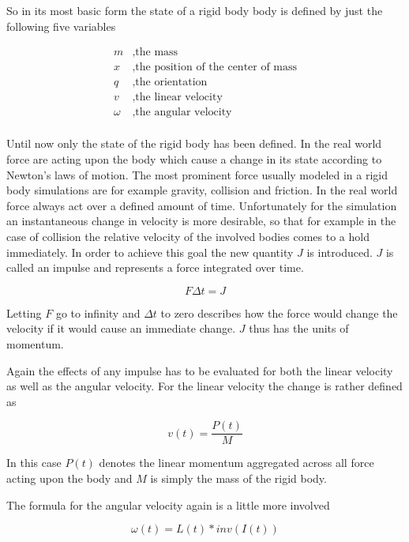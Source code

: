 So in its most basic form the state of a rigid body body is defined by just the following five variables

\begin{align*}
m &, \text{the mass} \\
x &, \text{the position of the center of mass} \\
q &, \text{the orientation} \\
v &, \text{the linear velocity} \\
\omega &, \text{the angular velocity} \\
\end{align*}

Until now only the state of the rigid body has been defined. In the real world force are acting upon the body which cause a change in its state according to Newton's laws of motion. The most prominent force usually modeled in a rigid body simulations are for example gravity, collision and friction. In the real world force always act over a defined amount of time. Unfortunately for the simulation an instantaneous change in velocity is more desirable, so that for example in the case of collision the relative velocity of the involved bodies comes to a hold immediately. In order to achieve this goal the new quantity $J$ is introduced. $J$ is called an impulse and represents a force integrated over time.

\begin{equation}
F \Delta t = J
\end{equation}

Letting $F$ go to infinity and $\Delta t$ to zero describes how the force would change the velocity if it would cause an immediate change. $J$ thus has the units of momentum. 

Again the effects of any impulse has to be evaluated for both the linear velocity as well as the angular velocity. For the linear velocity the change is rather defined as

\begin{equation}
v(t) = \frac{P(t)}{M}
\end{equation}

In this case $P(t)$ denotes the linear momentum aggregated across all force acting upon the body and $M$ is simply the mass of the rigid body.

The formula for the angular velocity again is a little more involved

\begin{equation}
\omega(t) = L(t) * inv(I(t))
\end{equation}

